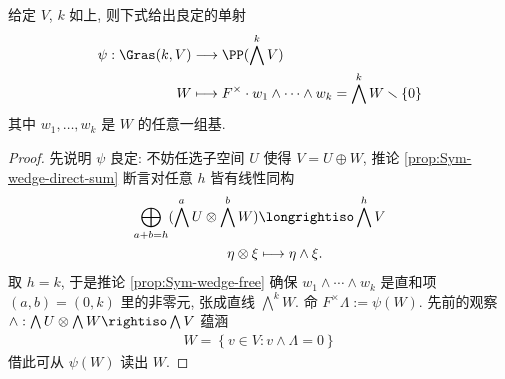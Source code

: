 \begin{definition-theorem}[Plücker 嵌入] 
	给定 $V$, $k$ 如上, 则下式给出良定的单射
	\begin{align*}
		\psi: \Gras(k,V) & \longrightarrow \PP( \bigwedge^k V) \\
		W & \longmapsto F^\times \cdot w_1 \wedge \cdots \wedge w_k = \bigwedge^k W \smallsetminus \{0\}
	\end{align*}
	其中 $w_1, \ldots, w_k$ 是 $W$ 的任意一组基.
\end{definition-theorem}
\begin{proof}
	先说明 $\psi$ 良定: 不妨任选子空间 $U$ 使得 $V = U \oplus W$, 推论 \ref{prop:Sym-wedge-direct-sum} 断言对任意 $h$ 皆有线性同构
	\begin{align*}
		\bigoplus_{a+b=h} (\bigwedge^a U \otimes \bigwedge^b W) & \longrightiso \bigwedge^h V \\
		\eta \otimes \xi & \longmapsto \eta \wedge \xi.
	\end{align*}
	取 $h=k$, 于是推论 \ref{prop:Sym-wedge-free} 确保 $w_1 \wedge \cdots \wedge w_k$ 是直和项 $(a,b)=(0,k)$ 里的非零元, 张成直线 $\bigwedge^k W$. 命 $F^\times \Lambda := \psi(W)$. 先前的观察 $\wedge: \bigwedge U \otimes \bigwedge W \rightiso \bigwedge V$ 蕴涵
	\begin{gather}\label{eqn:Plucker-recovery}
		W = \left\{ v \in V : v \wedge \Lambda = 0 \right\}
	\end{gather}
	借此可从 $\psi(W)$ 读出 $W$.
\end{proof}

